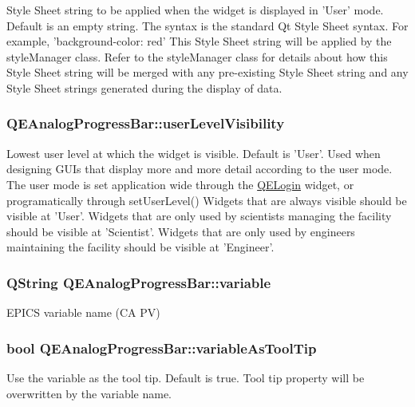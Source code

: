 Style Sheet string to be applied when the widget is displayed in 'User' mode. Default is an empty string. The syntax is the standard Qt Style Sheet syntax. For example, 'background-\/color: red' This Style Sheet string will be applied by the styleManager class. Refer to the styleManager class for details about how this Style Sheet string will be merged with any pre-\/existing Style Sheet string and any Style Sheet strings generated during the display of data. \hypertarget{classQEAnalogProgressBar_a0cbd8e0e0efd615267693c4454919808}{
\subsubsection[{userLevelVisibility}]{ QEAnalogProgressBar::userLevelVisibility}}
\label{classQEAnalogProgressBar_a0cbd8e0e0efd615267693c4454919808}
Lowest user level at which the widget is visible. Default is 'User'. Used when designing GUIs that display more and more detail according to the user mode. The user mode is set application wide through the \hyperlink{classQELogin}{QELogin} widget, or programatically through setUserLevel() Widgets that are always visible should be visible at 'User'. Widgets that are only used by scientists managing the facility should be visible at 'Scientist'. Widgets that are only used by engineers maintaining the facility should be visible at 'Engineer'. \hypertarget{classQEAnalogProgressBar_ac9cb8f86c0abbbd9836ea91c14b483e4}{
\subsubsection[{variable}]{\setlength{\rightskip}{0pt plus 5cm}QString QEAnalogProgressBar::variable}}
\label{classQEAnalogProgressBar_ac9cb8f86c0abbbd9836ea91c14b483e4}
EPICS variable name (CA PV) \hypertarget{classQEAnalogProgressBar_adebc19a6d57ab0712c78663b060f0b95}{
\subsubsection[{variableAsToolTip}]{\setlength{\rightskip}{0pt plus 5cm}bool QEAnalogProgressBar::variableAsToolTip}}
\label{classQEAnalogProgressBar_adebc19a6d57ab0712c78663b060f0b95}
Use the variable as the tool tip. Default is true. Tool tip property will be overwritten by the variable name. 

